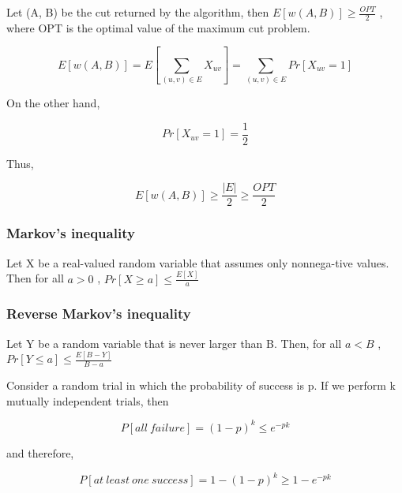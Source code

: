 \documentclass{article}
\begin{document}
Let (A, B) be the cut returned by the algorithm, then $E[w(A, B)] \ge \frac{OPT}{2}$ , where OPT is the optimal value of the maximum cut problem.

$$E[w(A,B)] = E[\sum\limits_{(u,v) \in E} X_{uv}] = \sum\limits_{(u,v) \in E} Pr[X_{uv} = 1]$$

On the other hand,

$$Pr[X_{uv} = 1] = \frac{1}{2}$$

Thus,

$$E[w(A,B)] \ge \frac{|E|}{2} \ge \frac{OPT}{2}$$

\subsubsection{Markov's inequality}
Let X be a real-valued random variable that assumes only nonnega-tive values. Then for all $a > 0$ , $Pr[X \ge a] \le \frac{E[X]}{a}$

\subsubsection{Reverse Markov's inequality}
Let Y be a random variable that is never larger than B. Then, for all $a < B$ , $Pr[Y \le a] \le \frac{E[B - Y]}{B - a}$

Consider a random trial in which the probability of success is p. If we perform k mutually independent trials,
then

$$P[all \ failure] = (1-p)^k \le e^{-pk}$$

and therefore,

$$P[at \ least \ one \ success] = 1 - (1-p)^k \ge 1 - e^{-pk}$$
\end{document}
